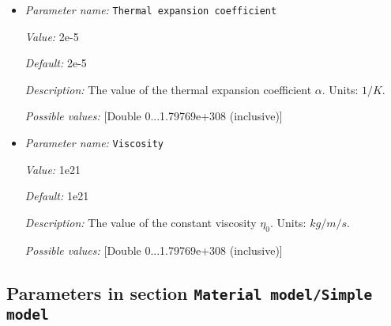 \begin{itemize}
{\it Value:} 4.7


{\it Default:} 4.7


{\it Description:} The value of the thermal conductivity $k$. Units: $W/m/K$.


{\it Possible values:} [Double 0...1.79769e+308 (inclusive)]
\item {\it Parameter name:} {\tt Thermal expansion coefficient}
\label{parameters:Material model/Simple compressible model/Thermal expansion coefficient}


{\it Value:} 2e-5


{\it Default:} 2e-5


{\it Description:} The value of the thermal expansion coefficient $\alpha$. Units: $1/K$.


{\it Possible values:} [Double 0...1.79769e+308 (inclusive)]
\item {\it Parameter name:} {\tt Viscosity}
\label{parameters:Material model/Simple compressible model/Viscosity}


{\it Value:} 1e21


{\it Default:} 1e21


{\it Description:} The value of the constant viscosity $\eta_0$. Units: $kg/m/s$.


{\it Possible values:} [Double 0...1.79769e+308 (inclusive)]
\end{itemize}

\subsection{Parameters in section \tt Material model/Simple model}
\label{parameters:Material_20model/Simple_20model}

